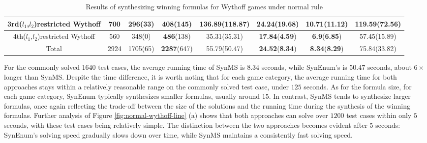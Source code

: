 \documentclass[review]{elsarticle}
\begin{document}
\begin{table}[h!]
\begin{tabular}{|c|c|c|c|c|c|c|c|}
        3rd($l_1$,$l_2$)\-restricted Wythoff & 700 & 296(33) & \textbf{408}(145) & 136.89(118.87) & \textbf{24.24}(\textbf{19.68}) & \textbf{10.71}(\textbf{11.12}) & 119.59(72.56) \\ \hline
        4th($l_1$,$l_2$)\-restricted Wythoff & 560 & 348(0) & \textbf{486}(138) & 35.31(35.31) & \textbf{17.84}(\textbf{4.59}) & \textbf{6.9}(\textbf{6.85}) & 57.45(15.89) \\ \hline 
        Total & 2924 & 1705(65) & \textbf{2287}(647) & 55.79(50.47) & \textbf{24.52}(\textbf{8.34}) & \textbf{8.34}(\textbf{8.29}) & 75.84(33.82) \\ \hline 
	\end{tabular}
	\caption{Results of synthesizing winning formulas for Wythoff games under normal rule}
	\label{tab:normal-wythoff-winFormulas}
\end{table}
For the commonly solved $1640$ test cases, the average running time of SynMS is $8.34$ seconds, while SynEnum's is $50.47$ seconds, about $6\times$ longer than SynMS. Despite the time difference, it is worth noting that for each game category, the average running time for both approaches stays within a relatively reasonable range on the commonly solved test case, under $125$ seconds. As for the formula size, for each game category, SynEnum typically synthesizes smaller formulas, usually around $15$. In contrast, SynMS tends to synthesize larger formulas, once again reflecting the trade-off between the size of the solutions and the running time during the synthesis of the winning formulas. Further analysis of Figure \ref{fig:normal-wythoff-line} (a) shows that both approaches can solve over $1200$ test cases within only $5$ seconds, with these test cases being relatively simple. 
The distinction between the two approaches becomes evident after $5$ seconds: SynEnum's solving speed gradually slows down over time, while SynMS maintains a consistently fast solving speed. 
\end{document}
